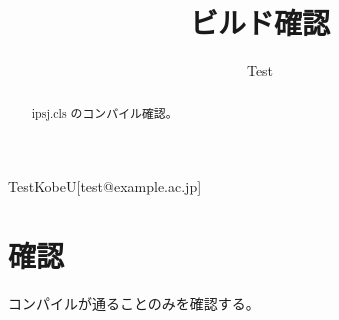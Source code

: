 \documentclass[submit]{ipsj}
\begin{document}
\title{ビルド確認}
\author{Test}{Test}{KobeU}[test@example.ac.jp]
\begin{abstract}
ipsj.cls のコンパイル確認。
\end{abstract}
\maketitle
\section{確認}
コンパイルが通ることのみを確認する。
\end{document}

